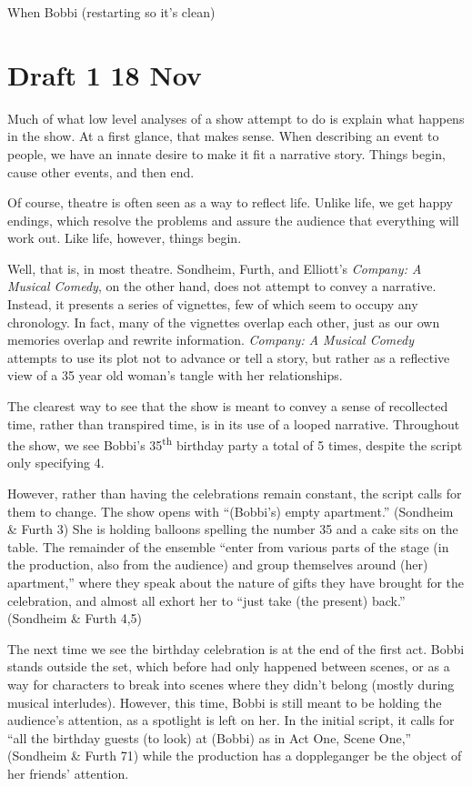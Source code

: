 \documentclass[12pt]{article}[titlepage]
\newcommand{\say}[1]{``#1''}
\newcommand{\1}{\={a}}
\newcommand{\2}{\={e}}
\newcommand{\3}{\={\i}}
\newcommand{\4}{\=o}
\newcommand{\5}{\=u}
\newcommand{\6}{\={A}}
\renewcommand{\,}{\textsuperscript{,}}
\begin{document}
When Bobbi  (restarting so it's clean)

\section{Draft 1 18 Nov}
Much of what low level analyses of a show attempt to do is explain what happens in the show.
At a first glance, that makes sense.
When describing an event to people, we have an innate desire to make it fit a narrative story.
Things begin, cause other events, and then end.

Of course, theatre is often seen as a way to reflect life.
Unlike life, we get happy endings, which resolve the problems and assure the audience that everything will work out.
Like life, however, things begin.

Well, that is, in most theatre.
Sondheim, Furth, and Elliott's \textit{Company: A Musical Comedy}, on the other hand, does not attempt to convey a narrative.
Instead, it presents a series of vignettes, few of which seem to occupy any chronology.
In fact, many of the vignettes overlap each other, just as our own memories overlap and rewrite information.
\textit{Company: A Musical Comedy} attempts to use its plot not to advance or tell a story, but rather as a reflective view of a 35 year old woman's tangle with her relationships.

The clearest way to see that the show is meant to convey a sense of recollected time, rather than transpired time, is in its use of a looped narrative.
Throughout the show, we see Bobbi's 35\textsuperscript{th} birthday party a total of 5 times, despite the script only specifying 4.

However, rather than having the celebrations remain constant, the script calls for them to change.
The show opens with \say{(Bobbi's) empty apartment.} (Sondheim \& Furth 3)
She is holding balloons spelling the number 35 and a cake sits on the table.
The remainder of the ensemble \say{enter from various parts of the stage (in the production, also from the audience) and group themselves around (her) apartment,} where they speak about the nature of gifts they have brought for the celebration, and almost all exhort her to \say{just take (the present) back.} (Sondheim \& Furth 4,5)

The next time we see the birthday celebration is at the end of the first act.
Bobbi stands outside the set, which before had only happened between scenes, or as a way for characters to break into scenes where they didn't belong (mostly during musical interludes).
However, this time, Bobbi is still meant to be holding the audience's attention, as a spotlight is left on her.
In the initial script, it calls for \say{all the birthday guests (to look) at (Bobbi) as in Act One, Scene One,} (Sondheim \& Furth 71) while the production has a doppleganger be the object of her friends' attention.
\end{document}
